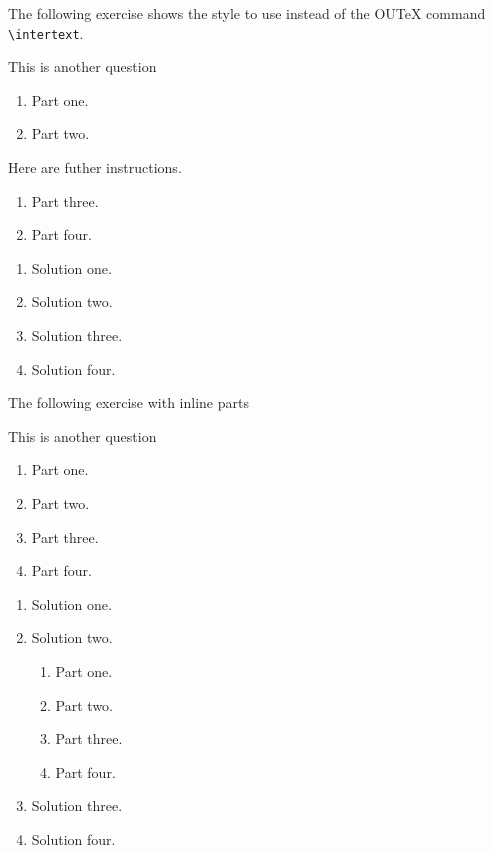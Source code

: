 \documentclass[solutionsatend]{ouunit}
\begin{document}
The following exercise shows the style to use instead of the OUTeX command \verb”\intertext”.
\begin{exercise}\label{exe-intertext}
This is another question
\begin{enumerate}
\item Part one.
\item Part two.
\end{enumerate}
Here are futher instructions.
\begin{enumerate}[resume]
\item Part three.
\item Part four.
\end{enumerate}
\begin{solution}
\begin{enumerate}
\item Solution one.
\item Solution two.
\item Solution three.
\item Solution four.
\end{enumerate}
\end{solution}
\end{exercise}
The following exercise with inline parts
\begin{exercise}\label{exe-intertext2}
This is another question
\begin{enumerate}
\item Part one.
\item Part two.
\item Part three.
\item Part four.
\end{enumerate}
\begin{solution}
\begin{enumerate}
\item Solution one.
\item Solution two.
\begin{enumerate}
\item Part one.
\item Part two.
\item Part three.
\item Part four.
\end{enumerate}
\item Solution three.
\item Solution four.
\end{enumerate}
\end{solution}
\end{exercise}
\end{document}
